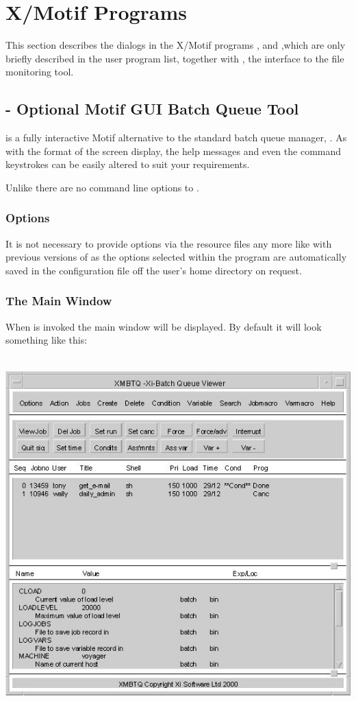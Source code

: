 \chapter{X/Motif Programs}
\label{chp:x-motif-programs}
This section describes the dialogs in the X/Motif programs \PrXmbtq{}, \PrXmbtr{} and \PrXmbtuser{},which are only briefly described in the user program list, together with \PrXmfilemon{}, the interface to the file monitoring tool.

\section{\XmbtqName{} - Optional Motif GUI Batch Queue Tool}
\PrXmbtq{} is a fully interactive Motif alternative to the standard batch queue manager, \PrBtq{}. As with
\PrBtq{} the format of the screen display, the help messages and even the command keystrokes can be easily altered to suit
your requirements.

Unlike \PrBtq{} there are no command line options to \PrXmbtq{}.

\subsection{Options}
It is not necessary to provide options via the resource files any more like with previous versions
of \PrXmbtq{} as the options selected within the program are automatically saved in the configuration
file \homeconfigpath{} off the user's home directory on request.

\subsection{The Main Window}
When \PrXmbtq{} is invoked the main window will be displayed. By default it will look something like this:

 \includegraphics[width=14.399cm,height=13.653cm]{img/ref12.jpg} 

